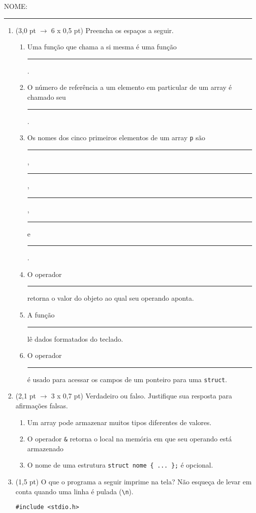 \documentclass[a4paper,10pt]{article}
\begin{document}
NOME: \rule{.85\textwidth}{0.1mm}

\begin{multicols*}{2}
\setlength{\leftmargini}{0pt}
\begin{enumerate}
  \item (3,0 pt $\rightarrow$ 6 x 0,5 pt) Preencha os espaços a seguir.

  \begin{enumerate}
    \item Uma função que chama a si mesma é uma função \rule{1cm}{0.2mm}. %
    \item O número de referência a um elemento em particular de um array é chamado seu \rule{1cm}{0.2mm}. %
    \item Os nomes dos cinco primeiros elementos de um array \texttt{p} são \rule{1cm}{0.2mm}, \rule{1cm}{0.2mm}, \rule{1cm}{0.2mm}, \rule{1cm}{0.2mm} e \rule{1cm}{0.2mm}. %
    \item O operador \rule{1cm}{0.2mm} retorna o valor do objeto ao qual seu operando aponta. %
    \item A função \rule{1cm}{0.2mm} lê dados formatados do teclado. %
    \item O operador \rule{1cm}{0.2mm} é usado para acessar os campos de um ponteiro para uma \texttt{struct}. %
  \end{enumerate}

  \item (2,1 pt $\rightarrow$ 3 x 0,7 pt) Verdadeiro ou falso. Justifique sua resposta para afirmações falsas.

  \begin{enumerate}
    \item Um array pode armazenar muitos tipos diferentes de valores. %
    \item O operador \texttt{\&} retorna o local na memória em que seu operando está armazenado %
    \item O nome de uma estrutura \texttt{struct nome \{ ... \};} é opcional. %
  \end{enumerate}

  \item (1,5 pt) O que o programa a seguir imprime na tela? Não esqueça de levar em conta quando uma linha é pulada (\texttt{\textbackslash n}).

  \begin{verbatim}
#include <stdio.h>


\end{verbatim}
\end{enumerate}
\end{multicols*}
\end{document}
